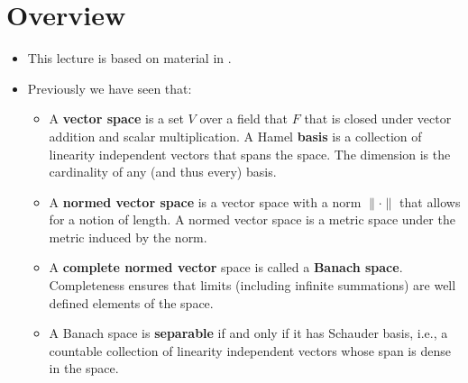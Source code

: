 \documentclass[11pt,twoside]{report}
\begin{document}



\section*{Overview} 

\begin{itemize}


\item This lecture is based on material in  \cite[Chapters~3 and 6]{chamberland:2023EF}.
\item Previously we have seen that:
\begin{itemize}
\item A \textbf{vector space} is a set $V$ over a field that $F$ that is closed under vector addition and scalar multiplication. A Hamel \textbf{basis} is a collection of linearity independent vectors that spans the space.  The dimension is the cardinality of any (and thus every) basis. 

\item A \textbf{normed vector space} is a vector space with a norm $\| \cdot\|$ that allows for a notion of length. A normed vector space is a metric space under the metric induced by the norm. 

\item A \textbf{complete normed vector} space is called a \textbf{Banach space}.  Completeness ensures that limits (including  infinite summations) are well defined elements of the space. 
\item A Banach space is  \textbf{separable} if and only if it has Schauder basis, i.e., a countable collection of linearity independent vectors whose span is dense in the space. 


\end{itemize}
\end{itemize}
\end{document}
